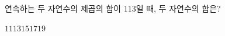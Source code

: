 연속하는 두 자연수의 제곱의 합이 $113$일 때, 두 자연수의 합은?
\begin{choices32}{$11$}{$13$}{$15$}{$17$}{$19$}\end{choices32}
